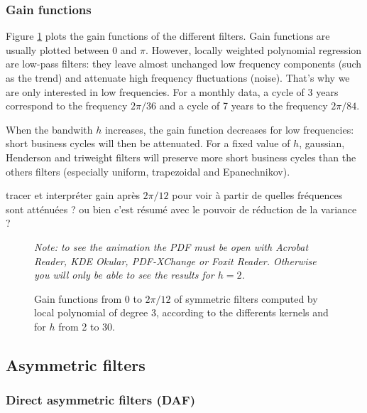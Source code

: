 \documentclass[
  12pt,
  ,
  a4paper]{article}
\newcommand\1{\mathds{1}}
\begin{document}
\hypertarget{gain-functions}{%
\subsubsection{Gain functions}\label{gain-functions}}

Figure \ref{fig:filtersSymgains} plots the gain functions of the different filters.
Gain functions are usually plotted between 0 and \(\pi\).
However, locally weighted polynomial regression are low-pass filters: they leave almost unchanged low frequency components (such as the trend) and attenuate high frequency fluctuations (noise).
That's why we are only interested in low frequencies.
For a monthly data, a cycle of 3 years correspond to the frequency \(2\pi/36\) and a cycle of 7 years to the frequency \(2\pi/84\).

When the bandwith \(h\) increases, the gain function decreases for low frequencies: short business cycles will then be attenuated.
For a fixed value of \(h\), gaussian, Henderson and triweight filters will preserve more short business cycles than the others filters (especially uniform, trapezoidal and Epanechnikov).

\colorbox{BurntOrange}{tracer et interpréter gain après $2\pi/12$ pour voir à partir de quelles fréquences sont atténuées ?}
\colorbox{BurntOrange}{ou bien c'est résumé avec le pouvoir de réduction de la variance ?}

\begin{figure}[!ht]
\caption{Gain functions from 0 to $2\pi/12$ of symmetric filters computed by local polynomial of degree $3$, according to the differents kernels and for $h$ from 2 to 30.}\label{fig:filtersSymgains}\footnotesize
\emph{Note: to see the animation the PDF must be open with Acrobat Reader, KDE Okular, PDF-XChange or Foxit Reader.
Otherwise you will only be able to see the results for $h=2$.}
\end{figure}

\hypertarget{asymmetric-filters}{%
\subsection{Asymmetric filters}\label{asymmetric-filters}}

\hypertarget{direct-asymmetric-filters-daf}{%
\subsubsection{Direct asymmetric filters (DAF)}\label{direct-asymmetric-filters-daf}}
\end{document}
